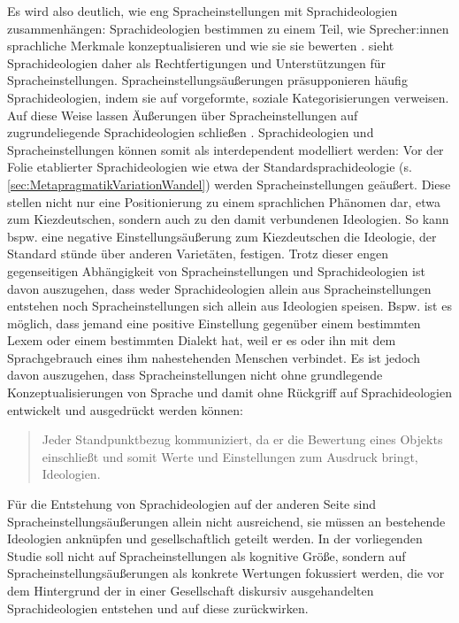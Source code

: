 \begin{sloppypar}
Es wird also deutlich, wie eng Spracheinstellungen mit Sprachideologien zusammenhängen: Sprachideologien bestimmen zu einem Teil, wie Sprecher:innen sprachliche Merkmale konzeptualisieren und wie sie sie bewerten \citep[s.][206]{Maitz2015}. 
\citet[8]{Garrett.2012} sieht Sprachideologien daher als Rechtfertigungen und Unterst{\"u}tzungen f{\"u}r Spracheinstellungen. 
Spracheinstellungsäußerungen präsupponieren häufig Sprachideologien, indem sie auf \glqq vorgeformte, soziale Kategorisierungen\grqq{} \citep[][213]{Tophinke.2006} verweisen.
Auf diese Weise lassen Äußerungen über Spracheinstellungen auf zugrundeliegende Sprachideologien schließen \citep[s.][35]{Garrett.2012}.
Sprachideologien und Spracheinstellungen können somit als interdependent modelliert werden:
Vor der Folie etablierter Sprachideologien wie etwa der Standardsprachideologie (s. \autoref{sec:MetapragmatikVariationWandel}) werden Spracheinstellungen geäußert. 
Diese stellen nicht nur eine Positionierung zu einem sprachlichen Phänomen dar, etwa zum Kiezdeutschen, sondern auch zu den damit verbundenen Ideologien. 
So kann bspw. eine negative Einstellungsäußerung zum Kiezdeutschen die Ideologie, der Standard stünde über anderen Varietäten, festigen. 
Trotz dieser engen gegenseitigen Abhängigkeit von Spracheinstellungen und Sprachideologien ist davon auszugehen, dass weder Sprachideologien allein aus Spracheinstellungen entstehen noch Spracheinstellungen sich allein aus Ideologien speisen. 
Bspw. ist es möglich, dass jemand eine positive Einstellung gegenüber einem bestimmten Lexem oder einem bestimmten Dialekt hat, weil er es oder ihn mit dem Sprachgebrauch eines ihm nahestehenden Menschen verbindet. 
Es ist jedoch davon auszugehen, dass Spracheinstellungen nicht ohne grundlegende Konzeptualisierungen von Sprache und damit ohne Rückgriff auf Sprachideologien entwickelt und ausgedrückt werden können:
\end{sloppypar}

\begin{quote}Jeder Standpunktbezug kommuniziert, da er die Bewertung eines {\frq}Objekts{\flq} einschlie{\ss}t und somit Werte und Einstellungen zum Ausdruck bringt, Ideologien.~\citep[270]{Spitzmuller2013}\end{quote}
Für die Entstehung von Sprachideologien auf der anderen Seite sind Spracheinstellungsäußerungen allein nicht ausreichend, sie müssen an bestehende Ideologien anknüpfen und gesellschaftlich geteilt werden. 
In der vorliegenden Studie %
soll nicht auf Spracheinstellungen als kognitive Größe, sondern auf Spracheinstellungsäußerungen als konkrete Wertungen fokussiert werden, %
die vor dem Hintergrund der in einer Gesellschaft diskursiv ausgehandelten Sprachideologien entstehen und auf diese zurückwirken. 
